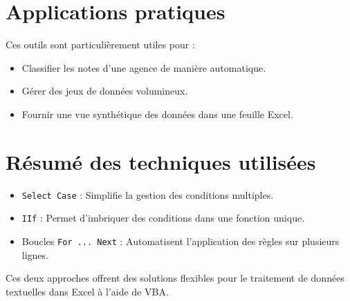 \documentclass[a4paper,12pt]{report}
\begin{document}
\section{Applications pratiques}

Ces outils sont particulièrement utiles pour :
\begin{itemize}
	\item Classifier les notes d'une agence de manière automatique.
	\item Gérer des jeux de données volumineux.
	\item Fournir une vue synthétique des données dans une feuille Excel.
\end{itemize}

\section{Résumé des techniques utilisées}

\begin{itemize}
	\item \texttt{Select Case} : Simplifie la gestion des conditions multiples.
	\item \texttt{IIf} : Permet d'imbriquer des conditions dans une fonction unique.
	\item Boucles \texttt{For ... Next} : Automatisent l'application des règles sur plusieurs lignes.
\end{itemize}

Ces deux approches offrent des solutions flexibles pour le traitement de données textuelles dans Excel à l'aide de VBA.

	
\end{document}
